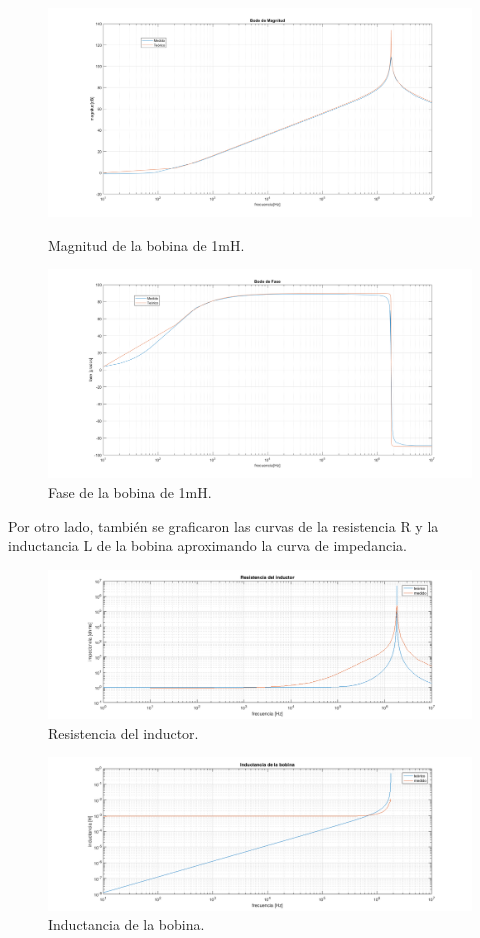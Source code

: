 \begin{figure}[H]
\centering
\includegraphics[scale=0.3]{Lmag.png}
\caption{Magnitud de la bobina de 1mH.}
\label{fig:Lmag}
\includegraphics[scale=0.3]{Lfase.png}
\caption{Fase de la bobina de 1mH.}
\label{fig:Lfase}
\end{figure}

Por otro lado, también se graficaron las curvas de la resistencia R y la inductancia L de la bobina aproximando la curva de impedancia.

\begin{figure}[H]
\centering
\includegraphics[scale=0.5]{resdelL.png}
\caption{Resistencia del inductor.}
\label{fig:RdelL}
\end{figure}

\begin{figure}[H]
\centering
\includegraphics[scale=0.5]{LdelL.png}
\caption{Inductancia de la bobina.}
\label{fig:LdelL}
\end{figure}

